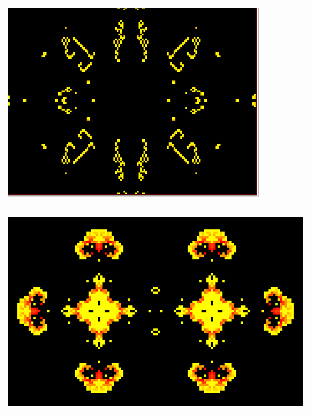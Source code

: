 \documentclass[12pt]{article}
\numberwithin{figure}{section} %
\begin{document}
\begin{figure}[H]
	\begin{subfigure}{0.45\textwidth}
     		\centering
     		\includegraphics[width=\linewidth]{Section1/8.1}
     		\subcaption{}
   	\end{subfigure}
     	\begin{subfigure}{0.53\textwidth}
     		\centering
     		\includegraphics[width=\linewidth]{Section1/8.2}
     		\subcaption{}
   	\end{subfigure}
     	\begin{subfigure}{0.42\textwidth}
     		\centering

\end{subfigure}
\end{figure}
\end{document}
